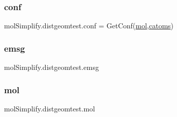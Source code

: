 \subsubsection{\texorpdfstring{conf}{conf}}
{\footnotesize\ttfamily mol\+Simplify.\+distgeomtest.\+conf = Get\+Conf(\hyperlink{namespacemolSimplify_1_1distgeomtest_a5e28bb8bf7c7b3fb5448fc4b5b9c1a40}{mol},\hyperlink{namespacemolSimplify_1_1distgeomtest_ac5885e0fbb6f960045fe4b660aaa1d4e}{catoms})}

\mbox{\label{namespacemolSimplify_1_1distgeomtest_ac24be1a514e33c45680af41886bfb547}} 
\subsubsection{\texorpdfstring{emsg}{emsg}}
{\footnotesize\ttfamily mol\+Simplify.\+distgeomtest.\+emsg}

\mbox{\label{namespacemolSimplify_1_1distgeomtest_a5e28bb8bf7c7b3fb5448fc4b5b9c1a40}} 
\subsubsection{\texorpdfstring{mol}{mol}}
{\footnotesize\ttfamily mol\+Simplify.\+distgeomtest.\+mol}

